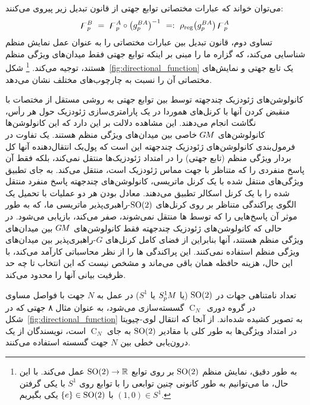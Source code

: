 می‌توان خواند که عبارات مختصاتی توابع جهتی از قانون تبدیل زیر پیروی می‌کنند:
\begin{align}
    \digamma_p^B\ =\ \digamma_p^A \circ \big(g_p^{BA}\big)^{-1}\ =:\ \rho_\textup{reg}\big( g_p^{BA}\big)\, \digamma_p^A
\end{align}
تساوی دوم، قانون تبدیل بین عبارات مختصاتی را به عنوان عمل نمایش منظم شناسایی می‌کند، که گزاره ما را مبنی بر اینکه توابع جهتی فقط میدان‌های ویژگی منظم هستند، توجیه می‌کند.%
\footnote{
    به طور دقیق، نمایش منظم $\operatorname{SO}(2)$ بر روی توابع $\operatorname{SO}(2) \to \mathbb{R}$ عمل می‌کند.
    با این حال، ما می‌توانیم به طور کانونی چنین توابعی را با توابع روی $S^1$ با یکی گرفتن $(1,0)\in S^1$ با $\{e\}\in\operatorname{SO}(2)$ یکی بگیریم.
}
شکل~\ref{fig:directional_function} یک تابع جهتی و نمایش‌های مختصاتی آن را نسبت به چارچوب‌های مختلف نشان می‌دهد.

کانولوشن‌های ژئودزیک چندجهته توسط \citet{poulenard2018multi} بین توابع جهتی به روشی مستقل از مختصات با منقبض کردن آنها با کرنل‌های هموردا در یک پارامتری‌سازی ژئودزیک حول هر رأس، نگاشت انجام می‌دهند.
این مشاهده دلالت بر این دارد که این کانولوشن‌ها کانولوشن‌های $G\mkern-1.4muM$ خاصی بین میدان‌های ویژگی منظم هستند.
یک تفاوت در فرمول‌بندی کانولوشن‌های ژئودزیک چندجهته این است که پول‌بک انتقال‌دهنده آنها کل بردار ویژگی منظم (تابع جهتی) را در امتداد ژئودزیک‌ها منتقل نمی‌کند، بلکه فقط آن پاسخ منفردی را که متناظر با جهت مماس ژئودزیک است، منتقل می‌کند.
به جای تطبیق ویژگی‌های منتقل شده با یک کرنل ماتریسی، کانولوشن‌های چندجهته پاسخ منفرد منتقل شده را با یک کرنل اسکالر تطبیق می‌دهند.
معادل بودن هر دو عملیات با تحمیل یک الگوی پراکندگی متناظر بر روی کرنل‌های $\operatorname{SO}(2)$-راهبری‌پذیر ماتریسی ما، که به طور موثر آن پاسخ‌هایی را که توسط ها منتقل نمی‌شوند، صفر می‌کند، بازیابی می‌شود.
در حالی که کانولوشن‌های ژئودزیک چندجهته فقط کانولوشن‌های $G\mkern-1.4muM$ بین میدان‌های ویژگی منظم هستند، آنها بنابراین از فضای کامل کرنل‌های $G$-راهبری‌پذیر بین میدان‌های ویژگی منظم استفاده نمی‌کنند.
این پراکندگی ها را از نظر محاسباتی کارآمد می‌کند، با این حال، هزینه حافظه همان باقی می‌ماند و مشخص نیست که این انتخاب تا چه حد ظرفیت بیانی آنها را محدود می‌کند.

تعداد نامتناهی جهات در $\operatorname{SO}(2)$ (یا $S^1_{\mkern-.5mu p}\mkern-.5muM$ یا $S^1$) در عمل به $N$ جهت با فواصل مساوی در گروه دوری~$\operatorname{C}_N$ گسسته‌سازی می‌شود، به عنوان مثال ۸ جهتی که در شکل~\ref{fig:directional_function} به تصویر کشیده شده‌اند.
از آنجا که انتقال لوی-چیویتا در امتداد ویژگی‌ها به طور کلی با مقادیر $\operatorname{SO}(2)$ به جای $\operatorname{C}_N$ است، نویسندگان از یک درون‌یابی خطی بین $N$ جهت گسسته استفاده می‌کنند.

